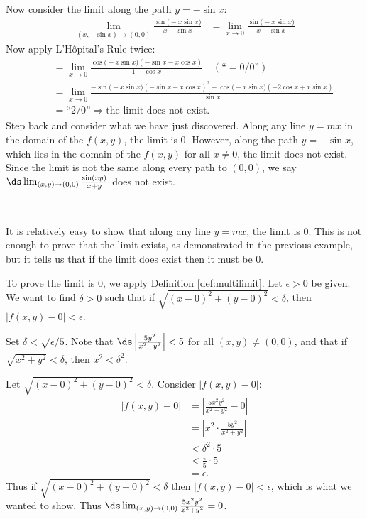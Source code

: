 {\begin{enumerate}
	Now consider the limit along the path $y=-\sin x$:
	\begin{align*}
	\lim_{(x,-\sin x)\to (0,0)} \frac{\sin\big(-x\sin x\big)}{x-\sin x} &= \lim_{x\to0} \frac{\sin\big(-x\sin x\big)}{x-\sin x}
	\end{align*}
	Now apply L'H\^opital's Rule twice:
	\small
	\begin{align*}
	 \quad &= \lim_{x\to 0}\frac{\cos\big(-x\sin x\big)(-\sin x-x\cos x)}{1-\cos x} \quad \left(\text{``}= 0/0\text{''}\right)\\
	&= \lim_{x\to 0}\frac{-\sin\big(-x\sin x\big)(-\sin x-x\cos x)^2+\cos\big(-x\sin x\big)(-2\cos x+x\sin x)}{\sin x}\\
	&= \text{``2/0''} \Rightarrow \text{the limit does not exist.}
	\end{align*}
	\normalsize
Step back and consider what we have just discovered. Along any line $y=mx$ in the domain of the $f(x,y)$, the limit is 0. However, along the path $y=-\sin x$, which lies in the domain of the $f(x,y)$ for all $x\neq 0$, the limit does not exist. Since the limit is not the same along every path to $(0,0)$, we say $\ds \lim_{(x,y)\to (0,0)}\frac{\sin(xy)}{x+y}$ does not exist.
\end{enumerate}
\baselineskip
}\\

{It is relatively easy to show that along any line $y=mx$, the limit is 0. This is not enough to prove that the limit exists, as demonstrated in the previous example, but it tells us that if the limit does exist then it must be 0.

To prove the limit is 0, we apply Definition \ref{def:multilimit}. Let $\epsilon >0$ be given. We want to find $\delta >0$ such that if $\sqrt{(x-0)^2+(y-0)^2} <\delta$, then $|f(x,y)-0| <\epsilon$.

Set $\delta < \sqrt{\epsilon/5}$. Note that $\ds \left|\frac{5y^2}{x^2+y^2}\right| <5$ for all $(x,y)\neq (0,0)$, and that if $\sqrt{x^2+y^2} <\delta$, then $x^2<\delta^2$.

Let $\sqrt{(x-0)^2+(y-0)^2}<\delta$. Consider $|f(x,y)-0|$:
\begin{align*}
|f(x,y)-0| &= \left|\frac{5x^2y^2}{x^2+y^2}-0\right| \\
				&= \left|x^2\cdot\frac{5y^2}{x^2+y^2}\right|\\
				&< \delta^2\cdot 5 \\
				&< \frac{\epsilon}{5}\cdot 5 \\
				&= \epsilon.
\end{align*}
Thus if $\sqrt{(x-0)^2+(y-0)^2}<\delta$ then $|f(x,y)-0|<\epsilon$, which is what we wanted to show. Thus $\ds \lim_{(x,y)\to(0,0)} \frac{5x^2y^2}{x^2+y^2} = 0$.
}\\

